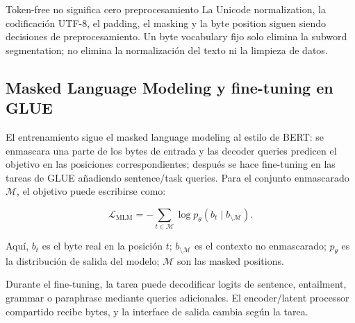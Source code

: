 
\begin{warningbox}{Token-free no significa cero preprocesamiento}
La Unicode normalization, la codificación UTF-8, el padding, el masking y la byte position siguen siendo decisiones de preprocesamiento. Un byte vocabulary fijo solo elimina la subword segmentation; no elimina la normalización del texto ni la limpieza de datos.
\end{warningbox}

\subsection{Masked Language Modeling y fine-tuning en GLUE}

El entrenamiento sigue el masked language modeling al estilo de BERT: se enmascara una parte de los bytes de entrada y las decoder queries predicen el objetivo en las posiciones correspondientes; después se hace fine-tuning en las tareas de GLUE añadiendo sentence/task queries. Para el conjunto enmascarado $\mathcal{M}$, el objetivo puede escribirse como:

\[
\mathcal{L}_{\text{MLM}}=-\sum_{t\in\mathcal{M}}\log p_\theta(b_t\mid b_{\setminus\mathcal{M}}).
\]

Aquí, $b_t$ es el byte real en la posición $t$; $b_{\setminus\mathcal{M}}$ es el contexto no enmascarado; $p_\theta$ es la distribución de salida del modelo; $\mathcal{M}$ son las masked positions.


Durante el fine-tuning, la tarea puede decodificar logits de sentence, entailment, grammar o paraphrase mediante queries adicionales. El encoder/latent processor compartido recibe bytes, y la interface de salida cambia según la tarea.


